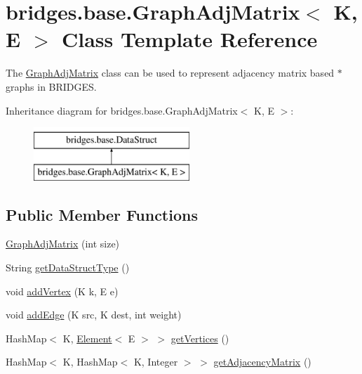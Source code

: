 \hypertarget{classbridges_1_1base_1_1_graph_adj_matrix}{}\section{bridges.\+base.\+Graph\+Adj\+Matrix$<$ K, E $>$ Class Template Reference}
\label{classbridges_1_1base_1_1_graph_adj_matrix}


The \hyperlink{classbridges_1_1base_1_1_graph_adj_matrix}{Graph\+Adj\+Matrix} class can be used to represent adjacency matrix based $\ast$ graphs in B\+R\+I\+D\+G\+E\+S.  


Inheritance diagram for bridges.\+base.\+Graph\+Adj\+Matrix$<$ K, E $>$\+:\begin{figure}[H]
\begin{center}
\leavevmode
\includegraphics[height=2.000000cm]{classbridges_1_1base_1_1_graph_adj_matrix}
\end{center}
\end{figure}
\subsection*{Public Member Functions}
\begin{DoxyCompactItemize}
\item 
\hyperlink{classbridges_1_1base_1_1_graph_adj_matrix_aaf71e89e2239d42f3ef37570665fb49d}{Graph\+Adj\+Matrix} (int size)
\item 
String \hyperlink{classbridges_1_1base_1_1_graph_adj_matrix_aa837a6bd0afbc700bf6277a062c5fdae}{get\+Data\+Struct\+Type} ()
\item 
void \hyperlink{classbridges_1_1base_1_1_graph_adj_matrix_a67d24d2ae069a8e1de6179ed58d7bca5}{add\+Vertex} (K k, E e)
\item 
void \hyperlink{classbridges_1_1base_1_1_graph_adj_matrix_af028f90cb574845cdddf9e5ec05130f8}{add\+Edge} (K src, K dest, int weight)
\item 
Hash\+Map$<$ K, \hyperlink{classbridges_1_1base_1_1_element}{Element}$<$ E $>$ $>$ \hyperlink{classbridges_1_1base_1_1_graph_adj_matrix_ac8270b3cbc4cf5f2f03c555ac6055423}{get\+Vertices} ()
\item 
Hash\+Map$<$ K, Hash\+Map$<$ K, Integer $>$ $>$ \hyperlink{classbridges_1_1base_1_1_graph_adj_matrix_a2bf0bf69333497b3b97788b74fe1f5b7}{get\+Adjacency\+Matrix} ()
\end{DoxyCompactItemize}
